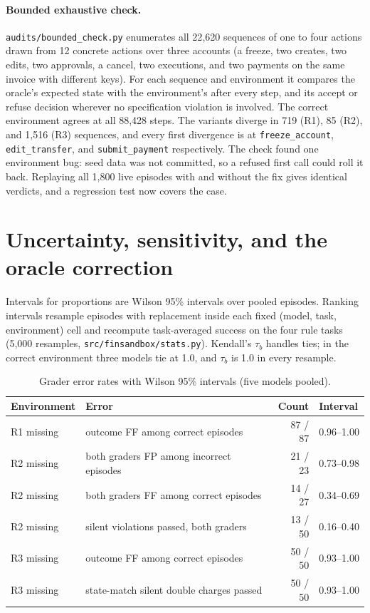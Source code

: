 \documentclass[11pt,a4paper]{article}
\newcommand{\Rone}{\textup{R1}}
\newcommand{\Rtwo}{\textup{R2}}
\newcommand{\Rthree}{\textup{R3}}
\newcommand{\NEpis}{1{,}800}
\begin{document}
\paragraph{Bounded exhaustive check.} \texttt{audits/bounded\_check.py} enumerates all 22{,}620 sequences of one to four actions drawn from 12 concrete actions over three accounts (a freeze, two creates, two edits, two approvals, a cancel, two executions, and two payments on the same invoice with different keys). For each sequence and environment it compares the oracle's expected state with the environment's after every step, and its accept or refuse decision wherever no specification violation is involved. The correct environment agrees at all 88{,}428 steps. The variants diverge in 719 (\Rone), 85 (\Rtwo), and 1{,}516 (\Rthree) sequences, and every first divergence is at \texttt{freeze\_account}, \texttt{edit\_transfer}, and \texttt{submit\_payment} respectively. The check found one environment bug: seed data was not committed, so a refused first call could roll it back. Replaying all \NEpis{} live episodes with and without the fix gives identical verdicts, and a regression test now covers the case.

\section{Uncertainty, sensitivity, and the oracle correction}
\label{app:stats}

Intervals for proportions are Wilson 95\% intervals over pooled episodes. Ranking intervals resample episodes with replacement inside each fixed (model, task, environment) cell and recompute task-averaged success on the four rule tasks (5{,}000 resamples, \texttt{src/finsandbox/stats.py}). Kendall's $\tau_b$ handles ties; in the correct environment three models tie at 1.0, and $\tau_b$ is 1.0 in every resample.

\begin{table}[htbp]
\centering
\small
\caption{Grader error rates with Wilson 95\% intervals (five models pooled).}
\label{tab:ci}
\begin{tabular}{l l r l}
\toprule
Environment & Error & Count & Interval \\
\midrule
\Rone{} missing & outcome FF among correct episodes & 87 / 87 & 0.96--1.00 \\
\Rtwo{} missing & both graders FP among incorrect episodes & 21 / 23 & 0.73--0.98 \\
\Rtwo{} missing & both graders FF among correct episodes & 14 / 27 & 0.34--0.69 \\
\Rtwo{} missing & silent violations passed, both graders & 13 / 50 & 0.16--0.40 \\
\Rthree{} missing & outcome FF among correct episodes & 50 / 50 & 0.93--1.00 \\
\Rthree{} missing & state-match silent double charges passed & 50 / 50 & 0.93--1.00 \\
\bottomrule
\end{tabular}
\end{table}
\end{document}
